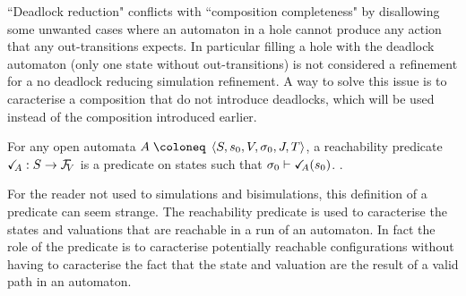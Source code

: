 \documentclass{article}
\begin{document}

``Deadlock reduction" conflicts with ``composition completeness" by disallowing some unwanted cases where an automaton in a hole cannot produce any action that any out-transitions expects.
In particular filling a hole with the deadlock automaton (only one state without out-transitions) is not considered a refinement for a no deadlock reducing simulation refinement.
A way to solve this issue is to caracterise a composition that do not introduce deadlocks, which will be used instead of the composition introduced earlier.
\begin{defi}[Reachability]
For any open automata \(A \defobject \OA{S}{s_0}{V}{\sigma_0}{J}{T}\), a reachability predicate \(\reach{A}: S \to \rformulae[V]\) is a predicate on states such that
 \(\sigma_0 \vdash \reach{A}\mpar{s_0}\).
 {}.
\end{defi}
For the reader not used to simulations and bisimulations, this definition of a predicate can seem strange.
The reachability predicate is used to caracterise the states and valuations that are reachable in a run of an automaton.
In fact the role of the predicate is to caracterise potentially reachable configurations without having to caracterise the fact that the state and valuation are the result of a valid path in an automaton.
\end{document}
